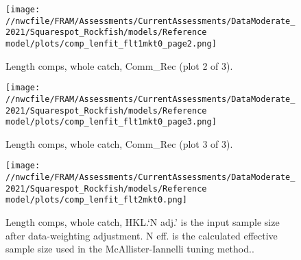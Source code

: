 \documentclass[11pt,
  english,
  a4paper,
]{article}
\begin{document}
\tagmcend\tagstructend


\begin{figure}
\centering
\texttt{[image: //nwcfile/FRAM/Assessments/CurrentAssessments/DataModerate\_2021/Squarespot\_Rockfish/models/Reference model/plots/comp\_lenfit\_flt1mkt0\_page2.png]}
\caption{Length comps, whole catch, Comm\_Rec (plot 2 of 3).\label{fig:comp_lenfit_flt1mkt0_page2}}
\end{figure}

\tagmcend\tagstructend


\begin{figure}
\centering
\texttt{[image: //nwcfile/FRAM/Assessments/CurrentAssessments/DataModerate\_2021/Squarespot\_Rockfish/models/Reference model/plots/comp\_lenfit\_flt1mkt0\_page3.png]}
\caption{Length comps, whole catch, Comm\_Rec (plot 3 of 3).\label{fig:comp_lenfit_flt1mkt0_page3}}
\end{figure}

\tagmcend\tagstructend


\begin{figure}
\centering
\texttt{[image: //nwcfile/FRAM/Assessments/CurrentAssessments/DataModerate\_2021/Squarespot\_Rockfish/models/Reference model/plots/comp\_lenfit\_flt2mkt0.png]}
\caption{Length comps, whole catch, HKL.`N adj.' is the input sample size after data-weighting adjustment. N eff. is the calculated effective sample size used in the McAllister-Iannelli tuning method..\label{fig:comp_lenfit_flt2mkt0}}
\end{figure}

\tagmcend\tagstructend
\end{document}
